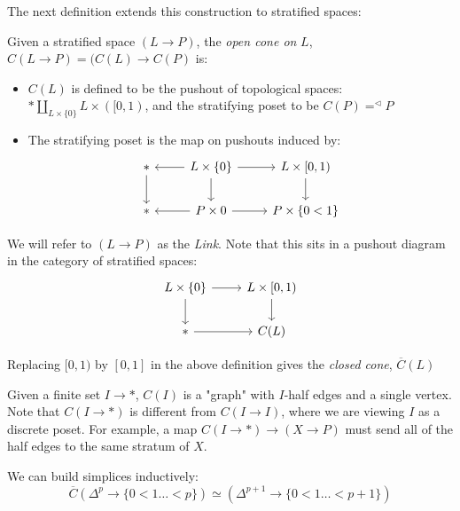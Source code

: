 The next definition extends this construction to stratified spaces:

\begin{defi}
Given a stratified space $(L \rightarrow P)$, the \textit{open cone on} $L$,
$C(L\rightarrow P ) = (C(L) \rightarrow C(P)$ is:
\begin{itemize}
    \item $C(L)$ is defined to be the pushout of topological
    spaces: $ * \amalg_{L \times \{0\}} L\times ([0, 1)$, and the
    stratifying poset to be $C(P) = ^\triangleleft P$
    \item The stratifying poset is the map on pushouts induced by:
    $$
    \begin{tikzcd}
    * \arrow[d] & L\times \{0\} \arrow[d] \arrow[l] \arrow[r] & {L \times [0, 1)} \arrow[d] \\
    *           & P\times 0 \arrow[l] \arrow[r]               & P \times \{0 < 1\}         
    \end{tikzcd}
    $$
\end{itemize}

We will refer to $(L\rightarrow P)$ as the \textit{Link}. Note that this sits
in a pushout diagram in the category of stratified spaces:
$$
\begin{tikzcd}
L\times \{0\} \arrow[r] \arrow[d] & {L\times [0, 1)} \arrow[d] \\
* \arrow[r]                       & C(L)                      
\end{tikzcd}
$$
\end{defi}

\begin{rek} 
    Replacing $[0 , 1)$ by $[0, 1]$ in the above definition gives the
    \textit{closed cone}, $\overline{C}(L)$
\end{rek}

\begin{ex}
    Given a finite set $I\rightarrow *$, $C(I)$ is a "graph" with
    $I$-half edges and a single vertex. Note that $C(I \rightarrow *)$ is
    different from $C(I \rightarrow I)$, where we are viewing $I$ as a discrete
    poset. For example, a map $C(I \rightarrow *) \rightarrow (X\rightarrow P)$
    must send all of the half edges to the same stratum of $X$.
\end{ex}

\begin{ex}
We can build simplices inductively: 
$$
\overline{C}(\Delta^p \rightarrow \{0 < 1 \dots <p \}) \simeq (\Delta^{p+1} \rightarrow \{0 < 1 \dots < p+1 \})
$$
\end{ex}

